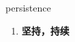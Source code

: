 
\begin{frame}
{\huge persistence}
\begin{center}
\begin{enumerate}\Large
  \item \textbf{坚持，持续}
\end{enumerate}
\end{center}
\end{frame}
